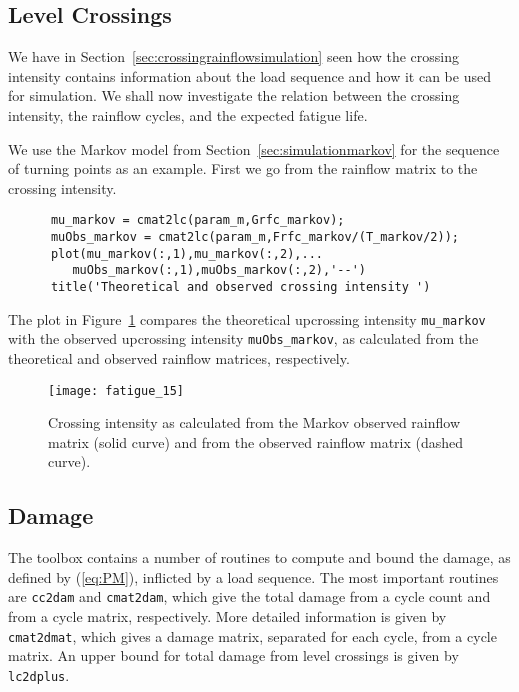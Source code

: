 \subsection{Level Crossings}
\label{sec:levelcrossings}
We have in Section~\ref{sec:crossingrainflowsimulation} seen how the crossing
intensity contains information about the load sequence and how it can be used
for simulation. We shall now investigate the relation between the crossing
intensity, the rainflow cycles, and the expected fatigue life.

We use the Markov model from Section~\ref{sec:simulationmarkov}
for the sequence of turning points as an example.
First we go from the rainflow matrix to the crossing
intensity.
{\small\begin{verbatim}
      mu_markov = cmat2lc(param_m,Grfc_markov);
      muObs_markov = cmat2lc(param_m,Frfc_markov/(T_markov/2));
      plot(mu_markov(:,1),mu_markov(:,2),...
         muObs_markov(:,1),muObs_markov(:,2),'--')
      title('Theoretical and observed crossing intensity ')
\end{verbatim}}
The plot in Figure~\ref{fig_wafo_6.10} compares the
theoretical upcrossing intensity \verb+mu_markov+
with the observed upcrossing intensity \verb+muObs_markov+, as calculated
from the theoretical and observed rainflow matrices, respectively.

\begin{figure}
\centering
\texttt{[image: fatigue\_15]}
\vspace{-3mm}
\caption[Crossing intensity from Markov and observed rainflow matrix]
{Crossing intensity as calculated from the Markov observed rainflow matrix
(solid curve) and from the observed rainflow matrix (dashed curve).}
\label{fig_wafo_6.10}
\end{figure}


\subsection{Damage}
\label{sec:damage}
The \progname{} toolbox contains a number of routines to compute and bound
the damage, as defined by (\ref{eq:PM}), inflicted by a load sequence.
The most important routines are {\tt cc2dam}
and {\tt cmat2dam}, which
give the total damage from a cycle count and from a cycle matrix,
respectively. More detailed information is given by
{\tt cmat2dmat},
which gives a damage matrix, separated for each cycle, from a cycle
matrix. An upper bound for total damage from level crossings is
given by {\tt lc2dplus}.

